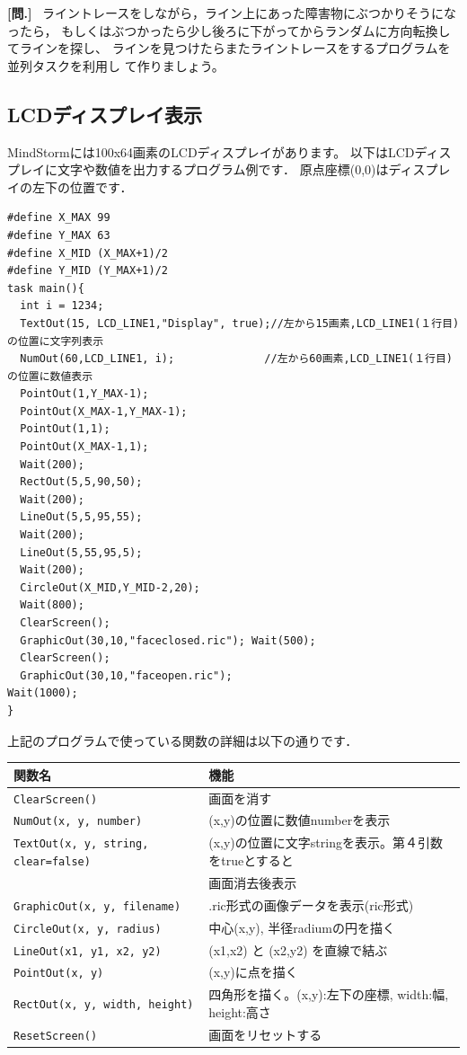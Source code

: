 \documentclass[11pt]{jarticle}
\makeatletter
\newcounter{qnum}[section]
\def\theqnum{問\thesection.\the\c@qnum}
\def\question{\refstepcounter{qnum}%
  \vspace{3mm}\noindent\textbf{[\theqnum]}~}
\makeatother
\begin{document}
\question
ライントレースをしながら，ライン上にあった障害物にぶつかりそうになったら，
もしくはぶつかったら少し後ろに下がってからランダムに方向転換してラインを探し、
ラインを見つけたらまたライントレースをするプログラムを並列タスクを利用し
て作りましょう。


\subsection{LCDディスプレイ表示\label{sec:LCD}}
MindStormには100x64画素のLCDディスプレイがあります。
以下はLCDディスプレイに文字や数値を出力するプログラム例です．
原点座標(0,0)はディスプレイの左下の位置です．

\begin{screen}{\small
\begin{verbatim}
#define X_MAX 99
#define Y_MAX 63
#define X_MID (X_MAX+1)/2
#define Y_MID (Y_MAX+1)/2
task main(){
  int i = 1234;
  TextOut(15, LCD_LINE1,"Display", true);//左から15画素,LCD_LINE1(１行目)の位置に文字列表示
  NumOut(60,LCD_LINE1, i);              //左から60画素,LCD_LINE1(１行目)の位置に数値表示
  PointOut(1,Y_MAX-1);
  PointOut(X_MAX-1,Y_MAX-1);
  PointOut(1,1);
  PointOut(X_MAX-1,1);
  Wait(200);
  RectOut(5,5,90,50);
  Wait(200);
  LineOut(5,5,95,55);
  Wait(200);
  LineOut(5,55,95,5);
  Wait(200);
  CircleOut(X_MID,Y_MID-2,20);
  Wait(800);
  ClearScreen();
  GraphicOut(30,10,"faceclosed.ric"); Wait(500);
  ClearScreen();
  GraphicOut(30,10,"faceopen.ric");
Wait(1000);
}
\end{verbatim}
}
\end{screen}

上記のプログラムで使っている関数の詳細は以下の通りです．
\begin{center}
\begin{tabular}[t]{l|l}\hline
関数名 & 機能 \\\hline
\verb|ClearScreen()| & 画面を消す\\
\verb|NumOut(x, y, number)| & (x,y)の位置に数値numberを表示\\
\verb|TextOut(x, y, string, clear=false)| & (x,y)の位置に文字stringを表示。第４引数をtrueとすると\\
& 画面消去後表示\\
\verb|GraphicOut(x, y, filename)| & .ric形式の画像データを表示(ric形式)\\
\verb|CircleOut(x, y, radius)| & 中心(x,y), 半径radiumの円を描く\\
\verb|LineOut(x1, y1, x2, y2)| & (x1,x2) と (x2,y2) を直線で結ぶ\\
\verb|PointOut(x, y)| & (x,y)に点を描く\\
\verb|RectOut(x, y, width, height)| & 四角形を描く。(x,y):左下の座標, width:幅, height:高さ\\
\verb|ResetScreen()| & 画面をリセットする\\\hline
\end{tabular}
\end{center}
\end{document}
